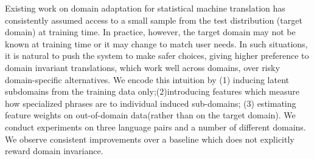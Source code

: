Existing work on domain adaptation for statistical machine translation has consistently assumed access to a small sample from the test distribution (target domain) at training time. In practice, however, the target domain may not be known at training time or it may change to match user needs. In such situations, it is natural to push the system to make safer choices, giving higher preference to domain invariant translations, which work well across domains, over risky domain-specific alternatives. We encode this intuition by (1) inducing latent subdomains from the training data only;(2)introducing features which measure how specialized phrases are to individual induced sub-domains; (3) estimating feature weights on out-of-domain data(rather than on the target domain). We conduct experiments on three language pairs and a number of different domains. We observe consistent improvements over a baseline which does not explicitly reward domain invariance.
